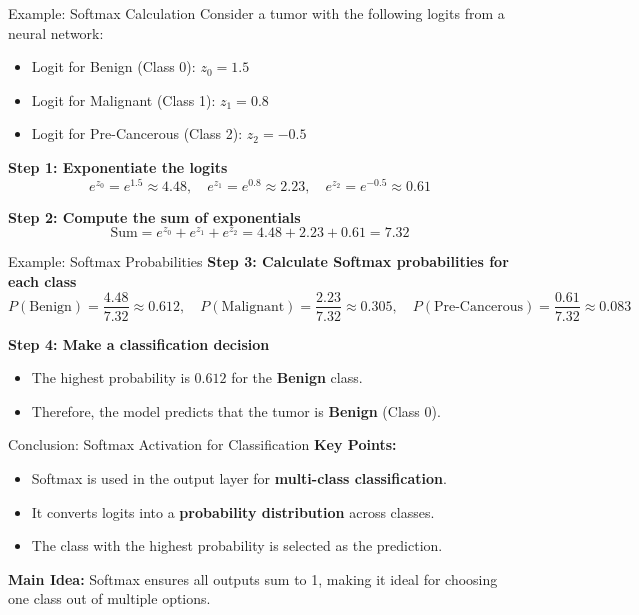 \documentclass[serif, aspectratio=169]{beamer}
\begin{document}
\begin{frame}{Example: Softmax Calculation}
    Consider a tumor with the following logits from a neural network:
    \begin{itemize}
        \item Logit for Benign (Class 0): \( z_0 = 1.5 \)
        \item Logit for Malignant (Class 1): \( z_1 = 0.8 \)
        \item Logit for Pre-Cancerous (Class 2): \( z_2 = -0.5 \)
    \end{itemize}
    
    \textbf{Step 1: Exponentiate the logits}
    \[
    e^{z_0} = e^{1.5} \approx 4.48, \quad e^{z_1} = e^{0.8} \approx 2.23, \quad e^{z_2} = e^{-0.5} \approx 0.61
    \]
    
    \textbf{Step 2: Compute the sum of exponentials}
    \[
    \text{Sum} = e^{z_0} + e^{z_1} + e^{z_2} = 4.48 + 2.23 + 0.61 = 7.32
    \]
\end{frame}

\begin{frame}{Example: Softmax Probabilities}
    \textbf{Step 3: Calculate Softmax probabilities for each class}
    \[
    P(\text{Benign}) = \frac{4.48}{7.32} \approx 0.612, \quad P(\text{Malignant}) = \frac{2.23}{7.32} \approx 0.305, \quad P(\text{Pre-Cancerous}) = \frac{0.61}{7.32} \approx 0.083
    \]
    
    \textbf{Step 4: Make a classification decision}
    \begin{itemize}
        \item The highest probability is \( 0.612 \) for the \textbf{Benign} class.
        \item Therefore, the model predicts that the tumor is \textbf{Benign} (Class 0).
    \end{itemize}
\end{frame}

\begin{frame}{Conclusion: Softmax Activation for Classification}
    \textbf{Key Points:}
    \begin{itemize}
        \item Softmax is used in the output layer for \textbf{multi-class classification}.
        \item It converts logits into a \textbf{probability distribution} across classes.
        \item The class with the highest probability is selected as the prediction.
    \end{itemize}
    
    \textbf{Main Idea:} Softmax ensures all outputs sum to 1, making it ideal for choosing one class out of multiple options.
\end{frame}
\end{document}
